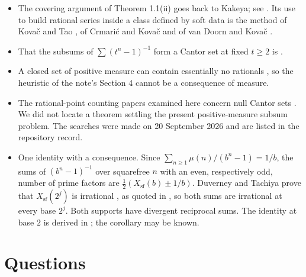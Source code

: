 \documentclass[11pt]{article}
\begin{document}
\begin{itemize}
\item The covering argument of Theorem 1.1(ii) goes back to Kakeya; see
  \cite{hornich1941,nitecki2013,fridy1966}.  Its use to build rational series
  inside a class defined by soft data is the method of Kova\v{c} and Tao
  \cite{kovactao2024}, of Crmari\'{c} and Kova\v{c} \cite{crmarickovac2025} and
  of van Doorn and Kova\v{c} \cite{vandoornkovac2025}.
\item That the subsums of $\sum(t^n-1)^{-1}$ form a Cantor set at fixed
  $t\ge2$ is \cite[Remark~4.1]{kovactao2024}.
\item A closed set of positive measure can contain essentially no rationals
  \cite{boesdarsterdos1981}, so the heuristic of the note's Section 4 cannot be
  a consequence of measure.
\item The rational-point counting papers examined here concern null Cantor
  sets \cite{rstw2019,chowvarjuyu2024}.  We did not locate a theorem settling
  the present positive-measure subsum problem.  The searches were made on
  20 September 2026 and are listed in the repository record.
\item One identity with a consequence.  Since
  $\sum_{n\ge1}\mu(n)/(b^n-1)=1/b$, the sums of $(b^n-1)^{-1}$ over squarefree
  $n$ with an even, respectively odd, number of prime factors are
  $\tfrac12(X_{\mathrm{sf}}(b)\pm1/b)$.  Duverney and Tachiya prove that
  $X_{\mathrm{sf}}(2^j)$ is irrational \cite[Corollary~1.2 and
  Example~1.1]{duverneytachiya}, as quoted in \cite[Section~6]{plectis257}, so
  both sums are irrational at every base $2^j$.  Both supports have divergent
  reciprocal sums.  The identity at base $2$ is derived in
  \cite[Section~5]{plectis249}; the corollary may be known.
\end{itemize}

\section{Questions}\label{sec:questions}
\end{document}
